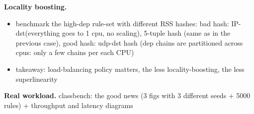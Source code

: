 \noindent%
\textbf{Locality boosting.} %
\begin{itemize}
\item benchmark the high-dep rule-set with different RSS hashes: bad hash: IP-dst(everything goes to 1 cpu, no scaling), 5-tuple hash (same as in the previous case), good hash: udp-dst hash (dep chains are partitioned across cpus: only a few chains per each CPU) 
\item  takeaway: load-balancing policy matters, the less locality-boosting, the less superlinearity
\end{itemize}

\noindent%
\textbf{Real workload.} %
classbench: the good news (3 figs with 3 different seeds + 5000 rules) + throughput and latency diagrams


